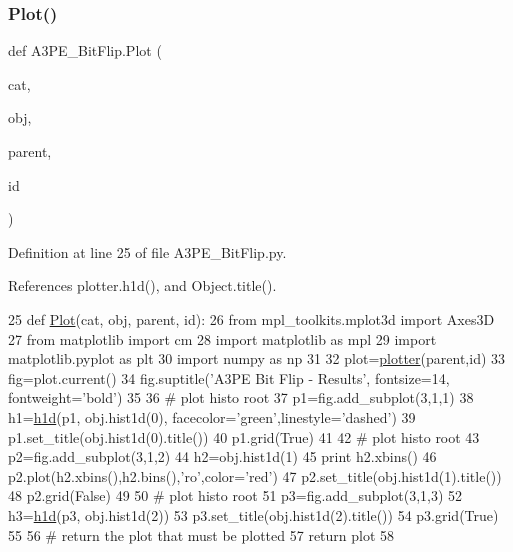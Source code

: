 \subsubsection{\texorpdfstring{Plot()}{Plot()}}
{\footnotesize\ttfamily def A3\+P\+E\+\_\+\+Bit\+Flip.\+Plot (\begin{DoxyParamCaption}\item[{}]{cat,  }\item[{}]{obj,  }\item[{}]{parent,  }\item[{}]{id }\end{DoxyParamCaption})}



Definition at line 25 of file A3\+P\+E\+\_\+\+Bit\+Flip.\+py.



References plotter.\+h1d(), and Object.\+title().


\begin{DoxyCode}
25 \textcolor{keyword}{def }\hyperlink{namespaceA3PE__BitFlip_a92d3bf7ea8a6d5c0a9a07bd018abc40a}{Plot}(cat, obj, parent, id):
26     \textcolor{keyword}{from} mpl\_toolkits.mplot3d \textcolor{keyword}{import} Axes3D
27     \textcolor{keyword}{from} matplotlib \textcolor{keyword}{import} cm
28     \textcolor{keyword}{import} matplotlib \textcolor{keyword}{as} mpl
29     \textcolor{keyword}{import} matplotlib.pyplot \textcolor{keyword}{as} plt
30     \textcolor{keyword}{import} numpy \textcolor{keyword}{as} np
31 
32     plot=\hyperlink{namespaceplotter}{plotter}(parent,id)
33     fig=plot.current()
34     fig.suptitle(\textcolor{stringliteral}{'A3PE Bit Flip - Results'}, fontsize=14, fontweight=\textcolor{stringliteral}{'bold'})
35 
36     \textcolor{comment}{# plot histo root}
37     p1=fig.add\_subplot(3,1,1)
38     h1=\hyperlink{namespaceplotter_a5d9521541ff0c72bf439078efacf2f42}{h1d}(p1, obj.hist1d(0), facecolor=\textcolor{stringliteral}{'green'},linestyle=\textcolor{stringliteral}{'dashed'})
39     p1.set\_title(obj.hist1d(0).title())
40     p1.grid(\textcolor{keyword}{True})
41 
42     \textcolor{comment}{# plot histo root}
43     p2=fig.add\_subplot(3,1,2)
44     h2=obj.hist1d(1)
45     \textcolor{keywordflow}{print} h2.xbins()
46     p2.plot(h2.xbins(),h2.bins(),\textcolor{stringliteral}{'ro'},color=\textcolor{stringliteral}{'red'})
47     p2.set\_title(obj.hist1d(1).title())
48     p2.grid(\textcolor{keyword}{False})
49 
50     \textcolor{comment}{# plot histo root}
51     p3=fig.add\_subplot(3,1,3)
52     h3=\hyperlink{namespaceplotter_a5d9521541ff0c72bf439078efacf2f42}{h1d}(p3, obj.hist1d(2))
53     p3.set\_title(obj.hist1d(2).title())
54     p3.grid(\textcolor{keyword}{True})
55 
56     \textcolor{comment}{# return the plot that must be plotted}
57     \textcolor{keywordflow}{return} plot
58 \end{DoxyCode}
